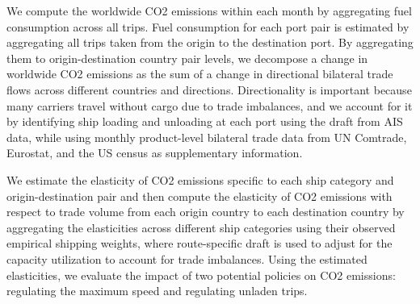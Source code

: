 \documentclass[hidelinks, 12pt,letterpaper]{article}
\begin{document}
We compute the worldwide CO2 emissions within each month by aggregating fuel consumption across all trips. Fuel consumption for each port pair is estimated by aggregating all trips taken from the origin to the destination port. By aggregating them to origin-destination country pair levels, we decompose a change in worldwide CO2 emissions as the sum of a change in directional bilateral trade flows across different countries and directions. Directionality is important because many carriers travel without cargo due to trade imbalances, and we account for it by identifying ship loading and unloading at each port using the draft from AIS data, while using monthly product-level bilateral trade data from UN Comtrade, Eurostat, and the US census as supplementary information. 

We estimate the elasticity of CO2 emissions specific to each ship category and origin-destination pair and then compute the elasticity of CO2 emissions with respect to trade volume from each origin country to each destination country by aggregating the elasticities across different ship categories using their observed empirical shipping weights, where route-specific draft is used to adjust for the capacity utilization to account for trade imbalances. Using the estimated elasticities, we evaluate the impact of two potential policies on CO2 emissions: regulating the maximum speed and regulating unladen trips.






 
 

 
\end{document}
